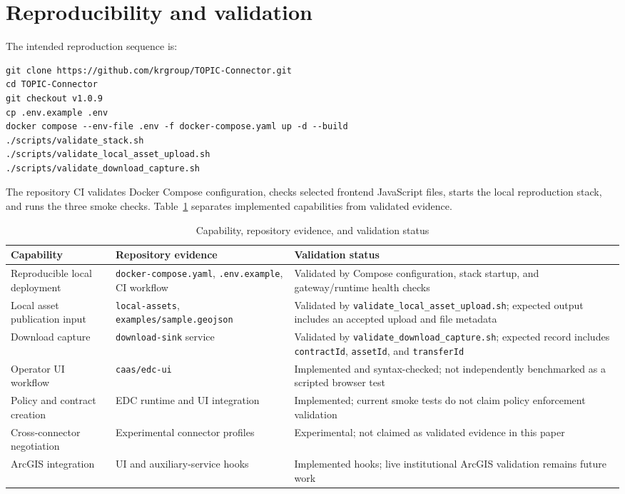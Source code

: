 \documentclass[preprint,12pt]{elsarticle}
\begin{document}
\section{Reproducibility and validation}
The intended reproduction sequence is:

\begin{verbatim}
git clone https://github.com/krgroup/TOPIC-Connector.git
cd TOPIC-Connector
git checkout v1.0.9
cp .env.example .env
docker compose --env-file .env -f docker-compose.yaml up -d --build
./scripts/validate_stack.sh
./scripts/validate_local_asset_upload.sh
./scripts/validate_download_capture.sh
\end{verbatim}

The repository CI validates Docker Compose configuration, checks selected frontend JavaScript files, starts the local reproduction stack, and runs the three smoke checks. Table~\ref{tab:evidence} separates implemented capabilities from validated evidence.

\begin{table}[t]
\caption{Capability, repository evidence, and validation status}
\label{tab:evidence}
\centering
\begin{tabular}{p{3.4cm} p{5.6cm} p{6.0cm}}
\toprule
\textbf{Capability} & \textbf{Repository evidence} & \textbf{Validation status} \\
\midrule
Reproducible local deployment & \texttt{docker-compose.yaml}, \texttt{.env.example}, CI workflow & Validated by Compose configuration, stack startup, and gateway/runtime health checks \\
Local asset publication input & \texttt{local-assets}, \texttt{examples/sample.geojson} & Validated by \texttt{validate\_local\_asset\_upload.sh}; expected output includes an accepted upload and file metadata \\
Download capture & \texttt{download-sink} service & Validated by \texttt{validate\_download\_capture.sh}; expected record includes \texttt{contractId}, \texttt{assetId}, and \texttt{transferId} \\
Operator UI workflow & \texttt{caas/edc-ui} & Implemented and syntax-checked; not independently benchmarked as a scripted browser test \\
Policy and contract creation & EDC runtime and UI integration & Implemented; current smoke tests do not claim policy enforcement validation \\
Cross-connector negotiation & Experimental connector profiles & Experimental; not claimed as validated evidence in this paper \\
ArcGIS integration & UI and auxiliary-service hooks & Implemented hooks; live institutional ArcGIS validation remains future work \\
\bottomrule
\end{tabular}
\end{table}
\end{document}
